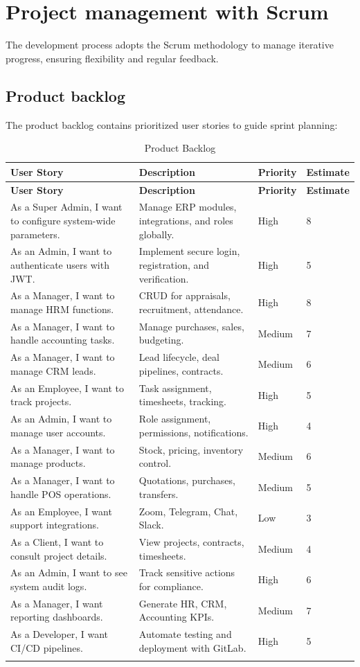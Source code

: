 \section{Project management with Scrum}
The development process adopts the Scrum methodology to manage iterative progress, ensuring flexibility and regular feedback.

\subsection{Product backlog}
The product backlog contains prioritized user stories to guide sprint planning:

\begin{longtable}{|p{3cm}|p{5cm}|p{3cm}|p{2cm}|}
\hline
\textbf{User Story} & \textbf{Description} & \textbf{Priority} & \textbf{Estimate} \\
\hline
\endfirsthead
\hline
\textbf{User Story} & \textbf{Description} & \textbf{Priority} & \textbf{Estimate} \\
\hline
\endhead
As a Super Admin, I want to configure system-wide parameters. & Manage ERP modules, integrations, and roles globally. & High & 8 \\
\hline
As an Admin, I want to authenticate users with JWT. & Implement secure login, registration, and verification. & High & 5 \\
\hline
As a Manager, I want to manage HRM functions. & CRUD for appraisals, recruitment, attendance. & High & 8 \\
\hline
As a Manager, I want to handle accounting tasks. & Manage purchases, sales, budgeting. & Medium & 7 \\
\hline
As a Manager, I want to manage CRM leads. & Lead lifecycle, deal pipelines, contracts. & Medium & 6 \\
\hline
As an Employee, I want to track projects. & Task assignment, timesheets, tracking. & High & 5 \\
\hline
As an Admin, I want to manage user accounts. & Role assignment, permissions, notifications. & High & 4 \\
\hline
As a Manager, I want to manage products. & Stock, pricing, inventory control. & Medium & 6 \\
\hline
As a Manager, I want to handle POS operations. & Quotations, purchases, transfers. & Medium & 5 \\
\hline
As an Employee, I want support integrations. & Zoom, Telegram, Chat, Slack. & Low & 3 \\
\hline
As a Client, I want to consult project details. & View projects, contracts, timesheets. & Medium & 4 \\
\hline
As an Admin, I want to see system audit logs. & Track sensitive actions for compliance. & High & 6 \\
\hline
As a Manager, I want reporting dashboards. & Generate HR, CRM, Accounting KPIs. & Medium & 7 \\
\hline
As a Developer, I want CI/CD pipelines. & Automate testing and deployment with GitLab. & High & 5 \\
\hline
\caption{Product Backlog}
\label{tab:product_backlog}
\end{longtable}

